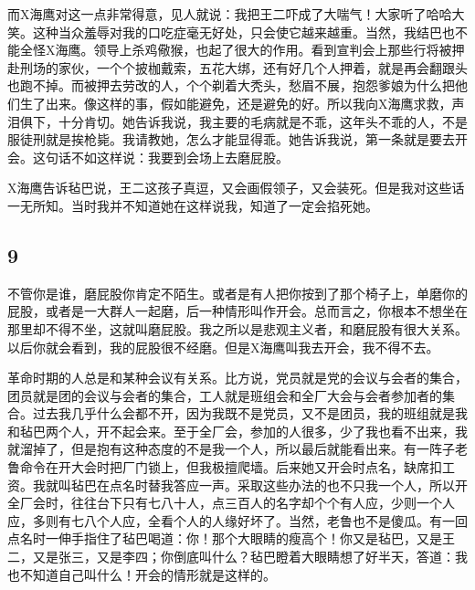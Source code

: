 而X海鹰对这一点非常得意，见人就说：我把王二吓成了大喘气！大家听了哈哈大笑。这种当众羞辱对我的口吃症毫无好处，只会使它越来越重。当然，我结巴也不能全怪X海鹰。领导上杀鸡儆猴，也起了很大的作用。看到宣判会上那些行将被押赴刑场的家伙，一个个披枷戴索，五花大绑，还有好几个人押着，就是再会翻跟头也跑不掉。而被押去劳改的人，个个剃着大秃头，愁眉不展，抱怨爹娘为什么把他们生了出来。像这样的事，假如能避免，还是避免的好。所以我向X海鹰求救，声泪俱下，十分肯切。她告诉我说，我主要的毛病就是不乖，这年头不乖的人，不是服徒刑就是挨枪毙。我请教她，怎么才能显得乖。她告诉我说，第一条就是要去开会。这句话不如这样说：我要到会场上去磨屁股。 

X海鹰告诉毡巴说，王二这孩子真逗，又会画假领子，又会装死。但是我对这些话一无所知。当时我并不知道她在这样说我，知道了一定会掐死她。 

\subsection{9} 

不管你是谁，磨屁股你肯定不陌生。或者是有人把你按到了那个椅子上，单磨你的屁股，或者是一大群人一起磨，后一种情形叫作开会。总而言之，你根本不想坐在那里却不得不坐，这就叫磨屁股。我之所以是悲观主义者，和磨屁股有很大关系。以后你就会看到，我的屁股很不经磨。但是X海鹰叫我去开会，我不得不去。 

革命时期的人总是和某种会议有关系。比方说，党员就是党的会议与会者的集合，团员就是团的会议与会者的集合，工人就是班组会和全厂大会与会者参加者的集合。过去我几乎什么会都不开，因为我既不是党员，又不是团员，我的班组就是我和毡巴两个人，开不起会来。至于全厂会，参加的人很多，少了我也看不出来，我就溜掉了，但是抱有这种态度的不是我一个人，所以最后就能看出来。有一阵子老鲁命令在开大会时把厂门锁上，但我极擅爬墙。后来她又开会时点名，缺席扣工资。我就叫毡巴在点名时替我答应一声。采取这些办法的也不只我一个人，所以开全厂会时，往往台下只有七八十人，点三百人的名字却个个有人应，少则一个人应，多则有七八个人应，全看个人的人缘好坏了。当然，老鲁也不是傻瓜。有一回点名时一伸手指住了毡巴喝道：你！那个大眼睛的瘦高个！你又是毡巴，又是王二，又是张三，又是李四；你倒底叫什么？毡巴瞪着大眼睛想了好半天，答道：我也不知道自己叫什么！开会的情形就是这样的。 

